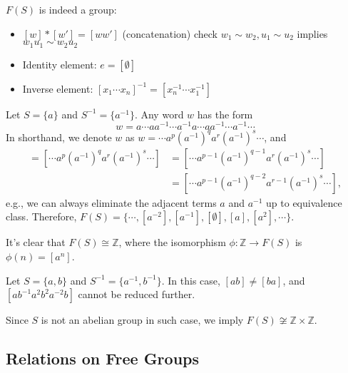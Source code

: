 \begin{remark}
$F(S)$ is indeed a group:
\begin{itemize}
\item
$[w]*[w']=[ww']$ (concatenation)
check $w_1\sim w_2,u_1\sim u_2$ implies $w_1u_1\sim w_2u_2$
\item
Identity element: $e=[\emptyset]$
\item
Inverse element: $[x_1\cdots x_n]^{-1}=[x_n^{-1}\cdots x_1^{-1}]$
\end{itemize}
\end{remark}
\begin{example}
Let $S=\{a\}$ and $S^{-1}=\{a^{-1}\}$.
Any word $w$ has the form
\[
w=a\cdots aa^{-1}\cdots a^{-1}a\cdots aa^{-1}\cdots a^{-1}\cdots
\]
In shorthand, we denote $w$ as $w=\cdots a^p(a^{-1})^qa^r(a^{-1})^s\cdots$, and
\begin{align*}
[w]=[\cdots a^p(a^{-1})^qa^r(a^{-1})^s\cdots]
&=
[\cdots a^{p-1}(a^{-1})^{q-1}a^r(a^{-1})^s\cdots]\\
&=[\cdots a^{p-1}(a^{-1})^{q-2}a^{r-1}(a^{-1})^s\cdots],
\end{align*}
e.g., we can always eliminate the adjacent terms $a$ and $a^{-1}$ up to equivalence class.
Therefore, $F(S) = \{\cdots,[a^{-2}],[a^{-1}],[\emptyset],[a],[a^2],\cdots\}$.

It's clear that $F(S)\cong\mathbb{Z}$, where the isomorphism $\phi:\mathbb{Z}\to F(S)$ is $\phi(n) = [a^n]$.
\end{example}
\begin{example}
Let $S=\{a,b\}$ and $S^{-1}=\{a^{-1},b^{-1}\}$.
In this case, $[ab]\ne[ba]$, and $[ab^{-1}a^2b^2a^{-2}b]$ cannot be reduced further.

Since $S$ is not an abelian group in such case, we imply $F(S)\not\cong\mathbb{Z}\times\mathbb{Z}$.
\end{example}

\subsection{Relations on Free Groups}

